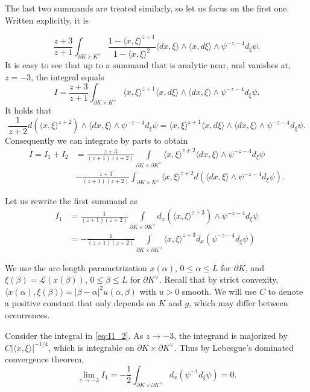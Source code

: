 \documentclass[reqno,10pt]{amsart}
\begin{document}
The last two summands are treated similarly, so let us focus on the first one. Written explicitly, it is

$$\frac{z+3}{z+1}\int_{\partial K\times K^\vee} \frac{1-\langle x,\xi\rangle^{z+1}}{1-\langle x,\xi\rangle^2}\langle dx,\xi\rangle\wedge\langle x,d\xi\rangle\wedge  \psi^{-z-4}d_\xi\psi.$$
It is easy to see that up to a summand that is analytic near, and vanishes at, $z=-3$, the integral equals
$$I=\frac{z+3}{z+1}\int_{\partial K\times K^\vee} \langle x,\xi\rangle^{z+1}\langle x,d\xi\rangle \wedge\langle dx,\xi\rangle\wedge \psi^{-z-4}d_\xi\psi.$$
It holds that $$\frac{1}{z+2}d(\langle x,\xi\rangle^{z+2})\wedge\langle dx,\xi\rangle\wedge \psi^{-z-4}d_\xi\psi=\langle x,\xi\rangle^{z+1}\langle x, d\xi\rangle \wedge \langle dx, \xi\rangle\wedge \psi^{-z-4}d_\xi\psi.$$
Consequently we can integrate by parts to obtain 
\begin{align*}I=I_1+I_2&=\frac{z+3}{(z+1)(z+2)}\int\limits_{\partial K\times\partial K^\vee}\langle x,\xi\rangle ^{z+2} \langle dx,\xi\rangle\wedge\psi^{-z-4}d_\xi\psi\\&-\frac{z+3}{(z+1)(z+2)}\int_{\partial K\times K^\vee} \langle x,\xi\rangle ^{z+2}  d(\langle dx,\xi\rangle \wedge\psi^{-z-4}d_\xi\psi). \end{align*}


Let us rewrite the first summand as
\begin{align}\nonumber I_1&=\frac{1}{(z+1)(z+2)}\int\limits_{\partial K\times \partial K^\vee}d_x(\langle x,\xi\rangle^{z+3})\wedge \psi^{-z-4}d_\xi\psi\\&=- \frac{1}{(z+1)(z+2)}\int\limits_{\partial K\times\partial K^\vee} \langle x,\xi\rangle^{z+3}d_x(\psi^{-z-4}d_\xi\psi)\label{eq:I1_2}  \end{align}

We use the arc-length parametrization $x(\alpha)$, $0\leq \alpha\leq L$ for $\partial K$, and $\xi (\beta)=\mathcal L(x(\beta))$, $0\leq \beta\leq L$ for $\partial K^\vee$. Recall that by strict convexity, $\langle x(\alpha), \xi(\beta)\rangle=|\beta-\alpha|^2u(\alpha, \beta)$ with $u>0$ smooth. We will use $C$ to denote a positive constant that only depends on $K$ and $g$, which may differ between occurrences. 

Consider the integral in \eqref{eq:I1_2}. As $z\to-3$, the integrand is majorized by $C|\langle x, \xi\rangle|^{-1/4}$, which is integrable on $\partial K\times\partial K^\vee$.  Thus by Lebesgue's dominated convergence theorem, $$\lim _{z\to -3} I_1=-\frac12\int_{\partial K\times\partial K^\vee}d_x(\psi^{-1}d_\xi\psi) =0.$$
\end{document}
